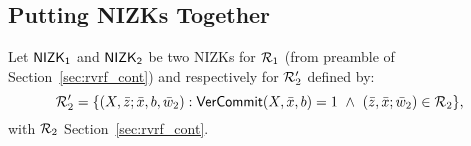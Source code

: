 \subsection{Putting NIZKs Together}
Let ${\mathsf{NIZK_1}}$ and ${\mathsf{NIZK_2}}$ be two NIZKs for $\mathcal{R}_1$ (from preamble of  Section~\ref{sec:rvrf_cont}) and respectively for $\mathcal{R}_2'$ defined by:
$$\mathcal{R}_2' = \{(X, \bar{z}; \bar{x}, b, \bar{w}_2): {\mathsf{VerCommit}}(X, \bar{x}, b) =1 \ \wedge \ (\bar{z}, \bar{x}; \bar{w}_2) \in \mathcal{R}_2 \},$$
\noindent with $\mathcal{R}_2$ Section~\ref{sec:rvrf_cont}. 


